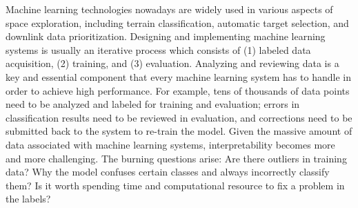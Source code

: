 Machine learning technologies nowadays are widely used in various aspects of 
space exploration, including terrain classification, automatic target selection, 
and downlink data prioritization. Designing and implementing machine learning 
systems is usually an iterative process which consists of (1) labeled data 
acquisition, (2) training, and (3) evaluation. Analyzing and reviewing data is 
a key and essential component that every machine learning system has to handle 
in order to achieve high performance. For example, tens of thousands of data 
points need to be analyzed and labeled for training and evaluation; errors in 
classification results need to be reviewed in evaluation, and corrections need 
to be submitted back to the system to re-train the model. Given the massive 
amount of data associated with machine learning systems, interpretability becomes 
more and more challenging. The burning questions arise: Are there outliers in 
training data? Why the model confuses certain classes and always incorrectly 
classify them? Is it worth spending time and computational resource to fix a 
problem in the labels?
